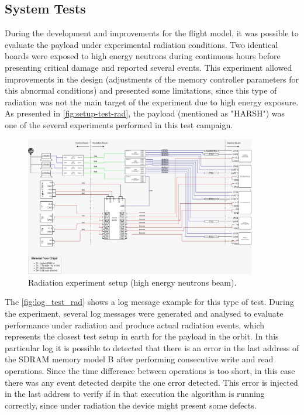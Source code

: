 \subsection{System Tests}

During the development and improvements for the flight model, it was possible to evaluate the payload under experimental radiation conditions. Two identical boards were exposed to high energy neutrons during continuous hours before presenting critical damage and reported several events. This experiment allowed improvements in the design (adjustments of the memory controller parameters for this abnormal conditions) and presented some limitations, since this type of radiation was not the main target of the experiment due to high energy exposure. As presented in \autoref{fig:setup-test-rad}, the payload (mentioned as "HARSH") was one of the several experiments performed in this test campaign.     

\begin{figure}[!ht]
    \begin{center}
        \includegraphics[width=0.9\textwidth]{figures/setup_test_rad.jpeg}
        \caption{Radiation experiment setup (high energy neutrons beam).}
        \label{fig:setup-test-rad}
    \end{center}
\end{figure}

The \autoref{fig:log_test_rad} shows a log message example for this type of test. During the experiment, several log messages were generated and analysed to evaluate performance under radiation and produce actual radiation events, which represents the closest test setup in earth for the payload in the orbit. In this particular log it is possible to detected that there is an error in the last address of the SDRAM memory model B after performing consecutive write and read operations. Since the time difference between operations is too short, in this case there was any event detected despite the one error detected. This error is injected in the last address to verify if in that execution the algorithm is running correctly, since under radiation the device might present some defects.  

